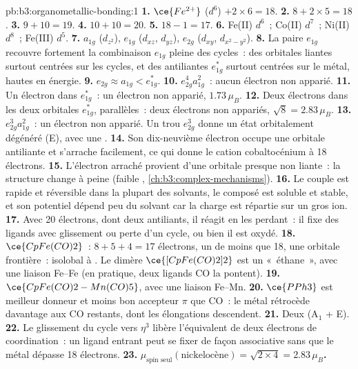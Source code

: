 \begin{solution}{pb:b3:organometallic-bonding:1}
\textbf{1.} $\ce{Fe^{2+}}$ ($d^6$) $+ 2 \times 6 = 18$.
\textbf{2.} $8 + 2 \times 5 = 18$.
\textbf{3.} $9 + 10 = 19$.
\textbf{4.} $10 + 10 = 20$.
\textbf{5.} $18 - 1 = 17$.
\textbf{6.} Fe(II) $d^6$~; Co(II) $d^7$~; Ni(II) $d^8$~; Fe(III) $d^5$.
\textbf{7.} $a_{1g}$ ($d_{z^2}$), $e_{1g}$ ($d_{xz}$, $d_{yz}$), $e_{2g}$ ($d_{xy}$, $d_{x^2-y^2}$).
\textbf{8.} La paire $e_{1g}$ recouvre fortement la combinaison $e_{1g}$ pleine des cycles~: des orbitales
liantes surtout centrées sur les cycles, et des antiliantes $e_{1g}^\ast$ surtout centrées sur le métal, hautes en
énergie.
\textbf{9.} $e_{2g} \approx a_{1g} < e_{1g}^\ast$.
\textbf{10.} $e_{2g}^4a_{1g}^2$~: aucun électron non apparié.
\textbf{11.} Un électron dans $e_{1g}^\ast$~: un électron non apparié, $1.73\,\mu_B$.
\textbf{12.} Deux électrons dans les deux orbitales $e_{1g}^\ast$, parallèles~: deux électrons non appariés, $\sqrt{8} =
2.83\,\mu_B$.
\textbf{13.} $e_{2g}^3a_{1g}^2$~: un électron non apparié. Un trou $e_{2g}^3$ donne un état orbitalement dégénéré
(E), avec une .
\textbf{14.} Son dix-neuvième électron occupe une orbitale antiliante et
s'arrache facilement, ce qui donne le cation cobaltocénium à 18 électrons.
\textbf{15.} L'électron arraché provient d'une orbitale presque non
liante~: la structure change à peine (faible ,
\cref{ch:b3:complex-mechanisms}).
\textbf{16.} Le couple est rapide et réversible dans la plupart des
solvants, le composé est soluble et stable, et son potentiel dépend peu du
solvant car la charge est répartie sur un gros ion.
\textbf{17.} Avec 20 électrons, dont deux antiliants, il réagit en les
perdant~: il fixe des ligands avec glissement ou perte d'un cycle, ou bien
il est oxydé.
\textbf{18.} $\ce{CpFe(CO)2}$~: $8 + 5 + 4 = 17$ électrons, un de moins que 18, une orbitale frontière~: isolobal
à . Le dimère $\ce{[CpFe(CO)2]2}$ est un «~éthane~», avec une liaison Fe--Fe (en pratique, deux ligands CO
la pontent).
\textbf{19.} $\ce{CpFe(CO)2-Mn(CO)5}$, avec une liaison Fe--Mn.
\textbf{20.} $\ce{PPh3}$ est meilleur donneur et moins bon accepteur $\pi$ que CO~: le métal rétrocède
davantage aux CO restants, dont les élongations descendent.
\textbf{21.} Deux (A$_1$ + E).
\textbf{22.} Le glissement du cycle vers $\eta^3$ libère l'équivalent de deux électrons de coordination~: un ligand
entrant peut se fixer de façon associative sans que le métal dépasse 18
électrons.
\textbf{23.} \textbf{$\mu_{\text{spin seul}}(\text{nickelocène}) = \sqrt{2 \times 4} = 2.83\,\mu_B$.}
\end{solution}
